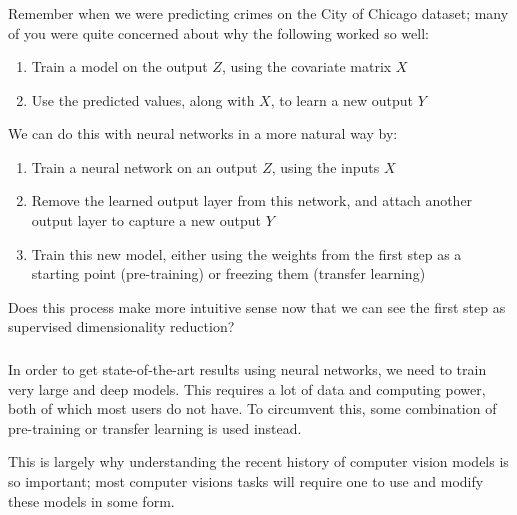 \documentclass[xetex,mathserif,serif,aspectratio=169]{beamer}
\begin{document}
\begin{frame}[fragile] \frametitle{} \oldB \footnotesize


Remember when we were predicting crimes on the City of Chicago dataset; many
of you were quite concerned about why the following worked so well:
\begin{enumerate}
\item Train a model on the output $Z$, using the covariate matrix $X$
\item Use the predicted values, along with $X$, to learn a new output $Y$
\end{enumerate}
\pause We can do this with neural networks in a more natural way by:
\begin{enumerate}
\item Train a neural network on an output $Z$, using the inputs $X$
\item Remove the learned output layer from this network, and attach another
output layer to capture a new output $Y$
\item Train this new model, either using the weights from the first step as
a starting point (pre-training) or freezing them (transfer learning)
\end{enumerate}
Does this process make more intuitive sense now that we can see the first
step as supervised dimensionality reduction?

\end{frame}

\begin{frame}[fragile] \frametitle{} \oldB \footnotesize


In order to get state-of-the-art results using neural networks, we
need to train very large and deep models. This requires a lot of
data and computing power, both of which most users do not have.
To circumvent this, some combination of pre-training or transfer
learning is used instead.

This is largely why understanding the recent history of computer
vision models is so important; most computer visions tasks will
require one to use and modify these models in some form.

\end{frame}
\end{document}

